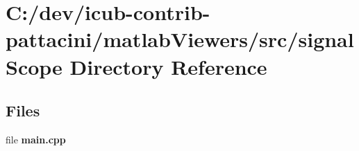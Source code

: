 \section{C\+:/dev/icub-\/contrib-\/pattacini/matlab\+Viewers/src/signal\+Scope Directory Reference}
\label{dir_722135a34af0503aff41292762281bbc}
\subsection*{Files}
\begin{DoxyCompactItemize}
\item 
file {\bfseries main.\+cpp}
\end{DoxyCompactItemize}
